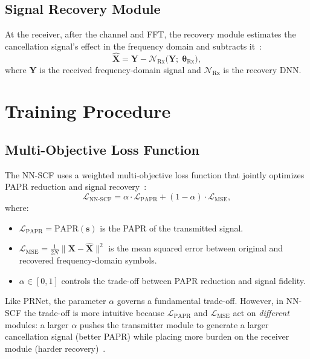 \subsection{Signal Recovery Module}

At the receiver, after the channel and FFT, the recovery module estimates
the cancellation signal's effect in the frequency domain and subtracts
it~\cite{zou2021novel}:
\begin{equation}
    \hat{\bm{X}} = \bm{Y} - \mathcal{N}_{\mathrm{Rx}}\!\bigl(\bm{Y};\;\bm{\theta}_{\mathrm{Rx}}\bigr),
    \label{eq:nnscf_rx_module}
\end{equation}
where $\bm{Y}$ is the received frequency-domain signal and
$\mathcal{N}_{\mathrm{Rx}}$ is the recovery DNN.


\section{Training Procedure}
\label{sec:nnscf_training}

\subsection{Multi-Objective Loss Function}

The NN-SCF uses a weighted multi-objective loss function that jointly
optimizes PAPR reduction and signal recovery~\cite{zou2021novel}:
\begin{equation}
    \mathcal{L}_{\mathrm{NN\text{-}SCF}}
    = \alpha \cdot \mathcal{L}_{\mathrm{PAPR}}
    + (1 - \alpha) \cdot \mathcal{L}_{\mathrm{MSE}},
    \label{eq:nnscf_loss}
\end{equation}
where:
\begin{itemize}
    \item $\mathcal{L}_{\mathrm{PAPR}} = \mathrm{PAPR}(\bm{s})$ is the
          PAPR of the transmitted signal.
    \item $\mathcal{L}_{\mathrm{MSE}} = \frac{1}{2N}\|\bm{X} - \hat{\bm{X}}\|^2$
          is the mean squared error between original and recovered
          frequency-domain symbols.
    \item $\alpha \in [0,1]$ controls the trade-off between PAPR reduction
          and signal fidelity.
\end{itemize}

\begin{keyinsight}
    Like PRNet, the parameter $\alpha$ governs a fundamental trade-off.
    However, in NN-SCF the trade-off is more intuitive because
    $\mathcal{L}_{\mathrm{PAPR}}$ and $\mathcal{L}_{\mathrm{MSE}}$ act on
    \emph{different} modules: a larger $\alpha$ pushes the transmitter
    module to generate a larger cancellation signal (better PAPR) while
    placing more burden on the receiver module (harder
    recovery)~\cite{zou2021novel}.
\end{keyinsight}


